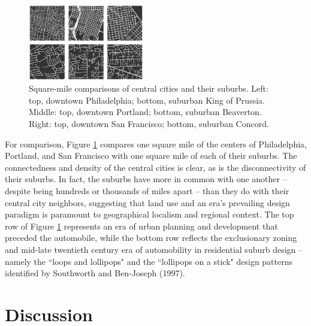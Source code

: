 \documentclass[Afour,sageh,times]{sage/sagej}
\begin{document}
\begin{figure}
\includegraphics[width=0.45\textwidth]{media/fig05.png}
\caption{Square-mile comparisons of central cities and their suburbs. Left: top, downtown Philadelphia; bottom, suburban King of Prussia. Middle: top, downtown Portland; bottom, suburban Beaverton. Right: top, downtown San Francisco; bottom, suburban Concord.}
\label{fig05}
\end{figure}

For comparison, Figure \ref{fig05} compares one square mile of the centers of Philadelphia, Portland, and San Francisco with one square mile of each of their suburbs. The connectedness and density of the central cities is clear, as is the disconnectivity of their suburbs. In fact, the suburbs have more in common with one another – despite being hundreds or thousands of miles apart – than they do with their central city neighbors, suggesting that land use and an era's prevailing design paradigm is paramount to geographical localism and regional context. The top row of Figure \ref{fig05} represents an era of urban planning and development that preceded the automobile, while the bottom row reflects the exclusionary zoning and mid-late twentieth century era of automobility in residential suburb design – namely the ``loops and lollipops" and the ``lollipops on a stick" design patterns identified by Southworth and Ben-Joseph (1997).

\section{Discussion}
\end{document}
